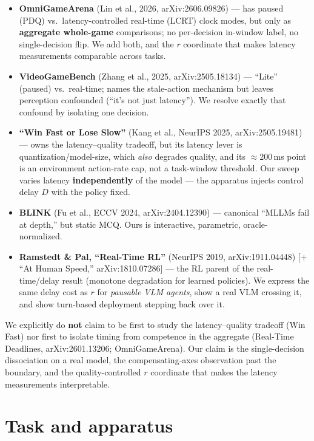 \documentclass[11pt]{article}
\begin{document}
\begin{itemize}
  \item \textbf{OmniGameArena} (Lin et al., 2026, arXiv:2606.09826) --- has
    paused (PDQ) vs.\ latency-controlled real-time (LCRT) clock modes, but only
    as \textbf{aggregate whole-game} comparisons; no per-decision in-window
    label, no single-decision flip. We add both, and the $r$ coordinate that
    makes latency measurements comparable across tasks.
  \item \textbf{VideoGameBench} (Zhang et al., 2025, arXiv:2505.18134) ---
    ``Lite'' (paused) vs.\ real-time; names the stale-action mechanism but
    leaves perception confounded (``it's not just latency''). We resolve exactly
    that confound by isolating one decision.
  \item \textbf{``Win Fast or Lose Slow''} (Kang et al., NeurIPS 2025,
    arXiv:2505.19481) --- owns the latency--quality tradeoff, but its latency
    lever is quantization/model-size, which \emph{also} degrades quality, and
    its $\approx$200\,ms point is an environment action-rate cap, not a
    task-window threshold. Our sweep varies latency \textbf{independently} of
    the model --- the apparatus injects control delay $D$ with the policy
    fixed.
  \item \textbf{BLINK} (Fu et al., ECCV 2024, arXiv:2404.12390) --- canonical
    ``MLLMs fail at depth,'' but static MCQ. Ours is interactive, parametric,
    oracle-normalized.
  \item \textbf{Ramstedt \& Pal, ``Real-Time RL''} (NeurIPS 2019,
    arXiv:1911.04448) [+ ``At Human Speed,'' arXiv:1810.07286] --- the RL parent
    of the real-time/delay result (monotone degradation for learned policies).
    We express the same delay cost as $r$ for \emph{pausable VLM agents}, show
    a real VLM crossing it, and show turn-based deployment stepping back over
    it.
\end{itemize}

We explicitly do \textbf{not} claim to be first to study the latency--quality
tradeoff (Win Fast) nor first to isolate timing from competence in the aggregate
(Real-Time Deadlines, arXiv:2601.13206; OmniGameArena). Our claim is the
single-decision dissociation on a real model, the compensating-axes observation
past the boundary, and the quality-controlled $r$ coordinate that makes the
latency measurements interpretable.

\section{Task and apparatus}
\end{document}
